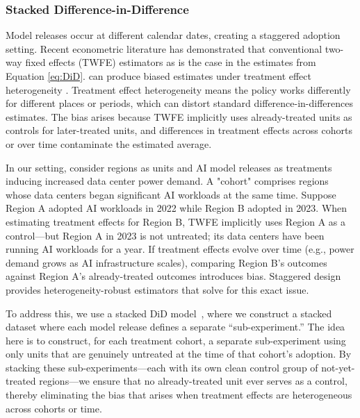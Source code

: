 \documentclass[a4paper,fleqn,longmktitle]{cas-sc}
\newcommand{\nb}[1]{\textcolor{blue}{NB[#1]}}
\theoremstyle{plain}
\theoremstyle{definition}
\begin{document}
\subsubsection{Stacked Difference-in-Difference}

Model releases occur at different calendar dates, creating a staggered adoption setting. Recent econometric literature has demonstrated that conventional two-way fixed effects (TWFE) estimators as is the case in the estimates from Equation \ref{eq:DiD}. 
can produce biased estimates under treatment effect heterogeneity 
\cite{goodman2021difference, sun2021treatment, callaway2021difference, borusyak2024revisiting}. Treatment effect heterogeneity means the policy works differently for different places or periods, which can distort standard difference-in-differences estimates. The bias arises because TWFE implicitly uses already-treated units as controls for later-treated units, and differences in treatment effects across cohorts or over time contaminate the estimated average. 

In our setting, consider regions as units and AI model releases as treatments inducing increased data center power demand. A "cohort" comprises regions whose data centers began significant AI workloads at the same time. Suppose Region A adopted AI workloads in 2022 while Region B adopted in 2023. When estimating treatment effects for Region B, TWFE implicitly uses Region A as a control—but Region A in 2023 is not untreated; its data centers have been running AI workloads for a year. If treatment effects evolve over time (e.g., power demand grows as AI infrastructure scales), comparing Region B's outcomes against Region A's already-treated outcomes introduces bias. Staggered design provides heterogeneity-robust estimators that solve for this exact issue.


To address this, we use a stacked DiD model~\cite{cengiz2019effect, deshpande2019screened}, where we construct a stacked dataset where each model release defines a separate ``sub-experiment.'' The idea here is to construct, for each treatment cohort, a separate sub-experiment using only units that are genuinely untreated at the time of that cohort's adoption. By stacking these sub-experiments—each with its own clean control group of not-yet-treated regions—we ensure that no already-treated unit ever serves as a control, thereby eliminating the bias that arises when treatment effects are heterogeneous across cohorts or time.
\end{document}
